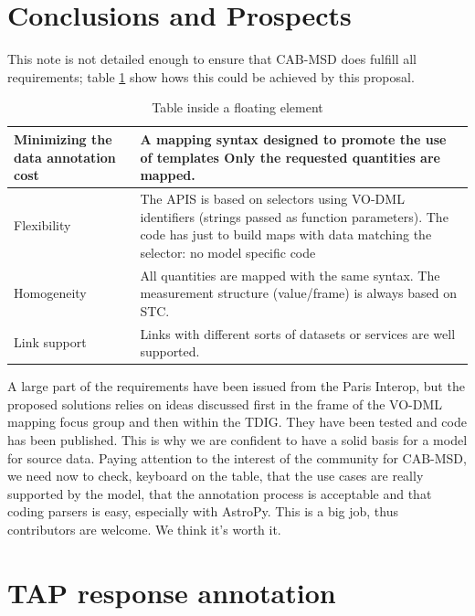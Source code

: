 \documentclass[11pt,a4paper]{ivoa}
\begin{document}
\section{Conclusions and Prospects}

This note is not detailed enough to ensure that  CAB-MSD does fulfill all requirements; table \ref{table:tconclusion} show hows this could be achieved by this proposal.

\begin{table}[H]
\begin{tabular}{|p{9em}|p{20em}|}
 \hline
Minimizing the data annotation cost & 
A mapping syntax designed to promote the use of templates
Only the requested quantities are mapped.
\\  
\hline
Flexibility & 
The APIS is based on selectors using VO-DML identifiers (strings passed as function parameters). 
The code has just to build maps with data matching the selector: no model specific code
\\
\hline
Homogeneity & 
All quantities are mapped with the same syntax. The measurement structure (value/frame) is always based on STC.
\\  
\hline
Link support &
Links with different sorts of datasets or services are well supported.
\\ 
\hline
\end{tabular}
\caption{Table inside a floating element}
\label{table:tconclusion}
\end{table}

A large part of the requirements have been issued from the Paris Interop, but the proposed solutions relies on ideas discussed first in the frame of the VO-DML mapping focus group and then within the TDIG. They have been tested and code has been published.
This is why we are confident to have a solid basis for a model for source data. Paying attention to the interest of the community for CAB-MSD, we need now to check, keyboard on the table, that the use cases are really supported by the model, that the annotation process is acceptable and that coding parsers is easy, especially with AstroPy.
This is a big job, thus contributors are welcome. We think it's worth it.

\appendix

\section{TAP response annotation}
\end{document}
